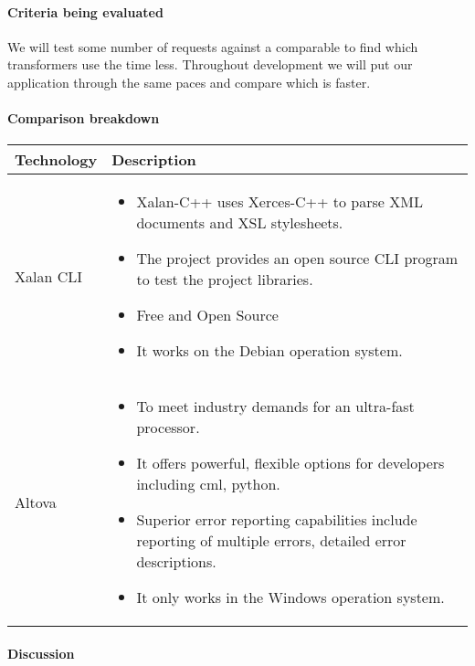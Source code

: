 \paragraph{Criteria being evaluated}

We will test some number of requests against a comparable to find which transformers use the time less.
Throughout development we will put our application through the same paces and compare which is faster.

\paragraph{Comparison breakdown}

\begin{center}
  \begin{tabular}{ | l | p{10cm} |}
    \hline
    Technology & Description  \\ \hline

    Xalan CLI \cite{Xalan-C} &
    \begin{itemize}
      \item Xalan-C++ uses Xerces-C++ to parse XML documents and XSL stylesheets.
      \item The project provides an open source CLI program to test the project libraries.
      \item Free and Open Source
      \item It works on the Debian operation system. 
    \end{itemize}\\ \hline

    Altova \cite{Altova} &
    \begin{itemize}
      \item To meet industry demands for an ultra-fast processor.
      \item It offers powerful, flexible options for developers including cml, python.
      \item Superior error reporting capabilities include reporting of multiple errors, detailed error descriptions.
      \item It only works in the Windows operation system. 
    \end{itemize} \\ \hline

  \end{tabular}
\end{center}

\paragraph{Discussion}

